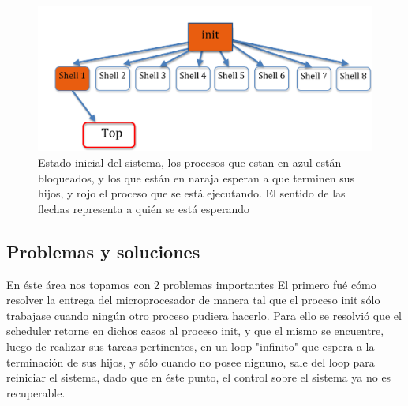 \documentclass[10pt,a4paper]{article}
\begin{document}
	\begin{figure}
	\begin{center} 
	\includegraphics[angle=0, width=1\textwidth ]{proceso2.png} 
	\caption{Estado inicial del sistema, los procesos que estan en azul est\'an bloqueados, y los que est\'an en naraja esperan a que terminen sus hijos, y rojo el proceso que se est\'a ejecutando. El sentido de las flechas representa a qui\'en se est\'a esperando}
	\end{center} 
	\end{figure}
	\subsection{Problemas y soluciones}
		En \'este \'area nos topamos con 2 problemas importantes El primero fu\'e c\'omo resolver la entrega del microprocesador de manera tal que el proceso init s\'olo trabajase cuando ning\'un otro proceso pudiera hacerlo. Para ello se resolvi\'o que el scheduler retorne en dichos casos al proceso init, y que el mismo se encuentre, luego de realizar sus tareas pertinentes, en un loop "infinito" que espera a la terminaci\'on de sus hijos, y s\'olo cuando no posee nignuno, sale del loop para reiniciar el sistema, dado que en \'este punto, el control sobre el sistema ya no es recuperable.
\end{document}
